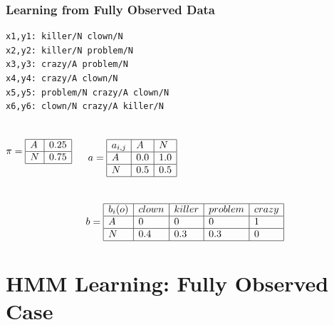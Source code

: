 \begin{frame}[fragile]
\frametitle{Learning from Fully Observed Data}
\begin{verbatim}
x1,y1: killer/N clown/N       
x2,y2: killer/N problem/N     
x3,y3: crazy/A problem/N
x4,y4: crazy/A clown/N
x5,y5: problem/N crazy/A clown/N
x6,y6: clown/N crazy/A killer/N
\end{verbatim}

\begin{columns}[c]
\column{1in}
\[ \pi = \begin{array}{|l|l|}
\hline
A & 0.25 \\ \hline
N & 0.75 \\ \hline
\end{array}
\]

\column{1in}
\[ a = \begin{array}{|l|l|l|}
\hline
a_{i,j} & A & N \\ \hline
A & 0.0 & 1.0 \\ \hline
N & 0.5 & 0.5 \\ \hline
\end{array}
\]
\end{columns}

\[ b = \begin{array}{|l|l|l|l|l|}
\hline
b_i(o) & clown & killer & problem & crazy \\ \hline
A & 0 & 0 & 0 & 1 \\ \hline
N & 0.4 & 0.3 & 0.3 & 0 \\ \hline
\end{array}
\]

\end{frame}


\section{HMM Learning: Fully Observed Case}


